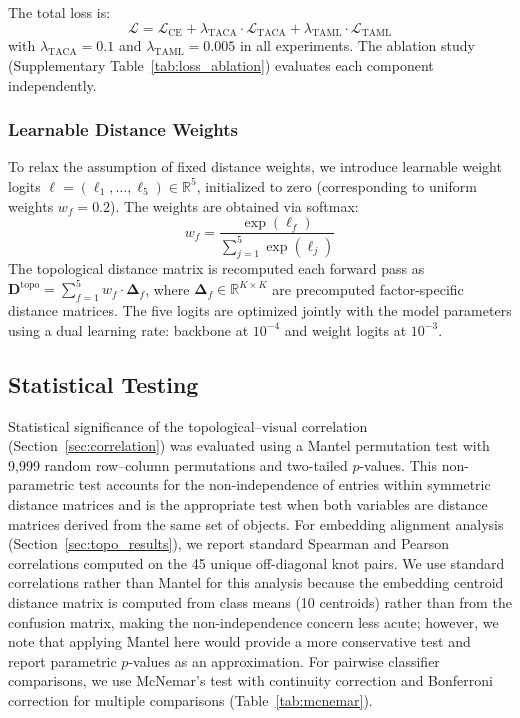 \documentclass[preprint,review,12pt]{elsarticle}
\begin{document}
The total loss is:
\begin{equation}
\mathcal{L} = \mathcal{L}_{\text{CE}} + \lambda_{\text{TACA}} \cdot \mathcal{L}_{\text{TACA}} + \lambda_{\text{TAML}} \cdot \mathcal{L}_{\text{TAML}}
\end{equation}
with $\lambda_{\text{TACA}} = 0.1$ and $\lambda_{\text{TAML}} = 0.005$ in all experiments. The ablation study (Supplementary Table~\ref{tab:loss_ablation}) evaluates each component independently.

\subsubsection{Learnable Distance Weights}

To relax the assumption of fixed distance weights, we introduce learnable weight logits $\boldsymbol{\ell} = (\ell_1, \ldots, \ell_5) \in \mathbb{R}^5$, initialized to zero (corresponding to uniform weights $w_f = 0.2$). The weights are obtained via softmax:
\begin{equation}
w_f = \frac{\exp(\ell_f)}{\sum_{j=1}^{5} \exp(\ell_j)}
\end{equation}
The topological distance matrix is recomputed each forward pass as $\mathbf{D}^{\text{topo}} = \sum_{f=1}^{5} w_f \cdot \boldsymbol{\Delta}_f$, where $\boldsymbol{\Delta}_f \in \mathbb{R}^{K \times K}$ are precomputed factor-specific distance matrices. The five logits are optimized jointly with the model parameters using a dual learning rate: backbone at $10^{-4}$ and weight logits at $10^{-3}$.

\subsection{Statistical Testing}
\label{sec:stats}

Statistical significance of the topological--visual correlation (Section~\ref{sec:correlation}) was evaluated using a Mantel permutation test \citep{mantel1967} with 9{,}999 random row--column permutations and two-tailed $p$-values. This non-parametric test accounts for the non-independence of entries within symmetric distance matrices and is the appropriate test when both variables are distance matrices derived from the same set of objects. For embedding alignment analysis (Section~\ref{sec:topo_results}), we report standard Spearman and Pearson correlations computed on the 45 unique off-diagonal knot pairs. We use standard correlations rather than Mantel for this analysis because the embedding centroid distance matrix is computed from class means (10 centroids) rather than from the confusion matrix, making the non-independence concern less acute; however, we note that applying Mantel here would provide a more conservative test and report parametric $p$-values as an approximation. For pairwise classifier comparisons, we use McNemar's test \citep{mcnemar1947} with continuity correction and Bonferroni correction for multiple comparisons (Table~\ref{tab:mcnemar}).
\end{document}

